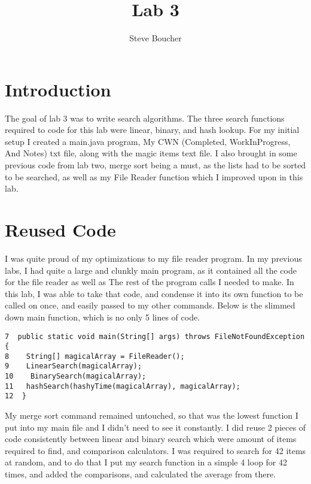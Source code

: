 \documentclass{article}
\title{Lab 3}
\author{Steve Boucher}
\begin{document}



\section{Introduction}
The goal of lab 3 was to write search algorithms. The three search functions required to code for this lab were linear, binary, and  hash lookup. For my initial setup I created a main.java program, My CWN (Completed, WorkInProgress, And Notes) txt file, along with the magic items text file. I also brought in some previous code from lab two, merge sort being a must, as the lists had to be sorted to be searched, as well as my File Reader function which I improved upon in this lab.

\section{Reused Code}
I was quite proud of my optimizations to my file reader program. In my previous labs, I had quite a large and clunkly main program, as it contained all the code for the file reader as well as The rest of the program calls I needed to make. In this lab, I was able to take that code, and condense it into its own function to be called on once, and easily passed to my other commands. Below is the slimmed down main function, which is no only 5 lines of code.
\begin{verbatim}
7  public static void main(String[] args) throws FileNotFoundException {
8    String[] magicalArray = FileReader();
9    LinearSearch(magicalArray);
10    BinarySearch(magicalArray);
11   hashSearch(hashyTime(magicalArray), magicalArray);
12  }
\end{verbatim}
My merge sort command remained untouched, so that was the lowest function I put into my main file and I didn't need to see it constantly. I did reuse 2 pieces of code consistently between linear and binary search which were amount of items required to find, and comparison calculators. I was required to search for 42 items at random, and to do that I put my search function in a simple 4 loop for 42 times, and added the comparisons, and calculated the average from there.
\end{document}
